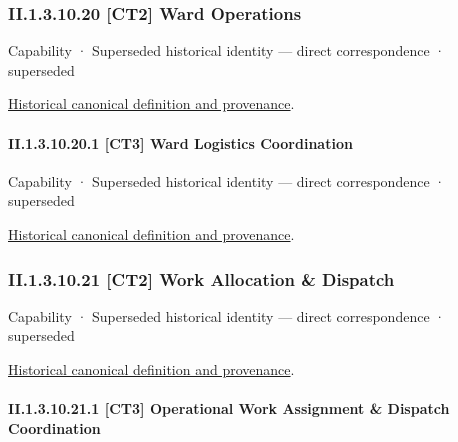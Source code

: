 \subsubsection*{II.1.3.10.20 [CT2] Ward Operations}
\label{navigation:II.1.3.10.20}

\label{element:bf3d2e3581f24beda20a6a3a3348460e}
{\small Capability · Superseded historical identity — direct correspondence · superseded}\par
\href{../../../../continuum/strategy/capability/bf3d2e3581f24beda20a6a3a3348460e.md}{Historical canonical definition and provenance}.\par
\paragraph*{II.1.3.10.20.1 [CT3] Ward Logistics Coordination}
\label{navigation:II.1.3.10.20.1}

\label{element:8a9dcc3b5f0143458ec71bc188a56020}
{\small Capability · Superseded historical identity — direct correspondence · superseded}\par
\href{../../../../continuum/strategy/capability/8a9dcc3b5f0143458ec71bc188a56020.md}{Historical canonical definition and provenance}.\par
\subsubsection*{II.1.3.10.21 [CT2] Work Allocation \& Dispatch}
\label{navigation:II.1.3.10.21}

\label{element:f8c13b6f74b840cc96fbeada5865455a}
{\small Capability · Superseded historical identity — direct correspondence · superseded}\par
\href{../../../../continuum/strategy/capability/f8c13b6f74b840cc96fbeada5865455a.md}{Historical canonical definition and provenance}.\par
\paragraph*{II.1.3.10.21.1 [CT3] Operational Work Assignment \& Dispatch Coordination}
\label{navigation:II.1.3.10.21.1}

